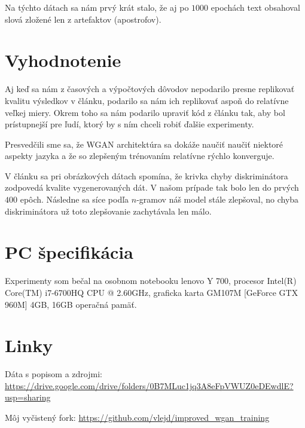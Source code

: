 \documentclass[10pt,a4paper]{article}
\begin{document}
Na týchto dátach sa nám prvý krát stalo, že aj po $1000$ epochách text obsahoval slová zložené len z artefaktov (apostrofov).

\section{Vyhodnotenie}
Aj keď sa nám z časových a výpočtových dôvodov nepodarilo presne replikovať kvalitu výsledkov v článku, podarilo sa nám ich replikovať aspoň do relatívne veľkej miery.
Okrem toho sa nám podarilo upraviť kód z článku tak, aby bol prístupnejší pre ľudí, ktorý by s ním chceli robiť ďalšie experimenty.

Presvedčili sme sa, že WGAN architektúra sa dokáže naučiť naučiť niektoré aspekty jazyka a že so zlepšeným trénovaním relatívne rýchlo konverguje.

V článku sa pri obrázkových dátach spomína, že krivka chyby diskriminátora zodpovedá kvalite vygenerovaných dát. 
V našom prípade tak bolo len do prvých $400$ epôch. Následne sa síce podľa $n$-gramov náš model stále zlepšoval, no chyba diskriminátora už toto zlepšovanie zachytávala len málo.

\section{PC špecifikácia}
Experimenty som bečal na osobnom notebooku lenovo Y 700, procesor Intel(R) Core(TM) i7-6700HQ CPU @ 2.60GHz, graficka karta GM107M [GeForce GTX 960M] 4GB, 16GB operačná pamäť.

\section{Linky}
Dáta s popisom a zdrojmi: \href{https://drive.google.com/drive/folders/0B7MLuc1jq3A8eFpVWUZ0eDEwdlE?usp=sharing}{https://drive.google.com/drive/folders/0B7MLuc1jq3A8eFpVWUZ0eDEwdlE?usp=sharing}

Môj vyčistený fork: \href{https://github.com/vlejd/improved\_wgan\_training}{https://github.com/vlejd/improved\_wgan\_training}
\end{document}
